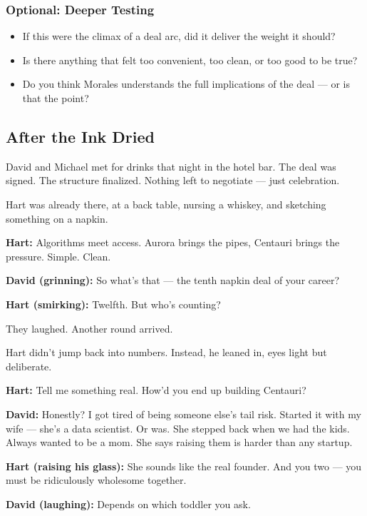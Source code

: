 \subsubsection{Optional: Deeper Testing}

\begin{itemize}
  \item If this were the climax of a deal arc, did it deliver the weight it should?
  \item Is there anything that felt too convenient, too clean, or too good to be true?
  \item Do you think Morales understands the full implications of the deal — or is that the point?
\end{itemize}




\subsection{After the Ink Dried}

David and Michael met for drinks that night in the hotel bar.  
The deal was signed. The structure finalized. Nothing left to negotiate — just celebration.

Hart was already there, at a back table, nursing a whiskey, and sketching something on a napkin.

\textbf{Hart:}  
Algorithms meet access. Aurora brings the pipes, Centauri brings the pressure.  
Simple. Clean.  

\textbf{David (grinning):}  
So what’s that — the tenth napkin deal of your career?

\textbf{Hart (smirking):}  
Twelfth. But who’s counting?

They laughed. Another round arrived.

Hart didn’t jump back into numbers. Instead, he leaned in, eyes light but deliberate.

\textbf{Hart:}  
Tell me something real.  
How’d you end up building Centauri?

\textbf{David:}  
Honestly? I got tired of being someone else’s tail risk.  
Started it with my wife — she’s a data scientist.  
Or was. She stepped back when we had the kids. Always wanted to be a mom.  
She says raising them is harder than any startup.

\textbf{Hart (raising his glass):}  
She sounds like the real founder.  
And you two — you must be ridiculously wholesome together.

\textbf{David (laughing):}  
Depends on which toddler you ask.


